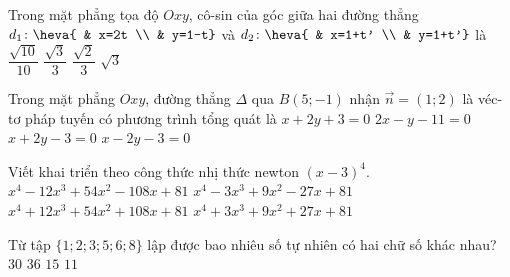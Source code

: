 \begin{ex}%
	Trong mặt phẳng tọa độ $Oxy$, cô-sin của góc giữa hai đường thẳng $d_1\colon\heva{
		& x=2t \\
		& y=1-t}$ và $d_2\colon\heva{
		& x=1+t' \\
		& y=1+t'}$ là
	\choice
	{\True $\dfrac{\sqrt{10}}{10}$}
	{$\dfrac{\sqrt{3}}{3}$}
	{$\dfrac{\sqrt{2}}{3}$}
	{$\sqrt{3}$}
\end{ex}
\begin{ex}%
	Trong mặt phẳng $Oxy$, đường thẳng $\Delta$ qua $B(5;-1)$ nhận $\overrightarrow{n}=(1;2)$ là véc-tơ pháp tuyến có phương trình tổng quát là 
	\choice
	{$x+2y+3=0$}
	{$2x-y-11=0$}
	{\True $x+2y-3=0$}
	{$x-2y-3=0$}
\end{ex}
\begin{ex}%
	Viết khai triển theo công thức nhị thức newton $(x-3)^4$. 
	\choice
	{\True $x^4-12x^3+54x^2-108x+81$}
	{$x^4-3x^3+9x^2-27x+81$}
	{$x^4+12x^3+54x^2+108x+81$}
	{$x^4+3x^3+9x^2+27x+81$}
\end{ex}
\begin{ex}%
	Từ tập $\{1;2;3;5;6;8\}$ lập được bao nhiêu số tự nhiên có hai chữ số khác nhau? 
	\choice
	{\True $30$}
	{$36$}
	{$15$}
	{$11$}
\end{ex}
